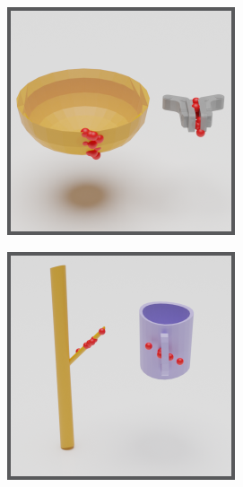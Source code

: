 \documentclass{article}
\begin{document}
\begin{figure}
    \centering
    \begin{subfigure}[b]{0.25\textwidth}
        \centering
        \includegraphics[width=\textwidth]{figures/contact_fig1.pdf}
        \caption{}
    \end{subfigure}
    \hspace{0.05\textwidth}
    \begin{subfigure}[b]{0.25\textwidth}
        \centering
        \includegraphics[width=\textwidth]{figures/contact_fig3.pdf}

\end{subfigure}
\end{figure}
\end{document}
